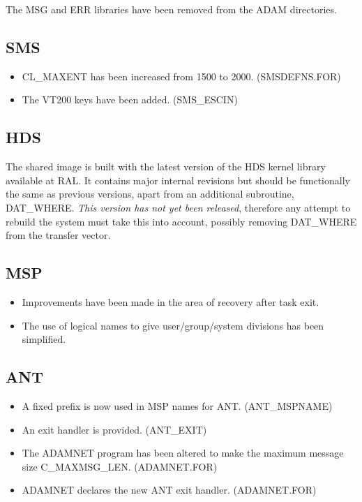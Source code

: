 The MSG and ERR libraries have been removed from the ADAM directories.

\subsection{SMS}
\begin{itemize}
\item CL\_MAXENT has been increased from 1500 to 2000. (SMSDEFNS.FOR)
\item The VT200 keys have been added. (SMS\_ESCIN)
\end{itemize}

\subsection{HDS}
The shared image is built with the latest version of the HDS kernel library
available at RAL. 
It contains major internal revisions but should be functionally the same as 
previous versions, apart from an additional subroutine, DAT\_WHERE.
{\em This version has not yet been released}, therefore any attempt to rebuild 
the system must take this into account, possibly removing DAT\_WHERE from the
transfer vector.

\subsection{MSP}
\begin{itemize}
\item Improvements have been made in the area of recovery after task exit.
\item The use of logical names to give user/group/system divisions has been
simplified.
\end{itemize}

\subsection{ANT}
\begin{itemize}
\item A fixed prefix is now used in MSP names for ANT. (ANT\_MSPNAME)
\item An exit handler is provided. (ANT\_EXIT)
\item The ADAMNET program has been altered to make the maximum message size
C\-\_MAXMSG\-\_LEN. (ADAMNET.FOR)
\item ADAMNET declares the new ANT exit handler. (ADAMNET.FOR)
\end{itemize}

